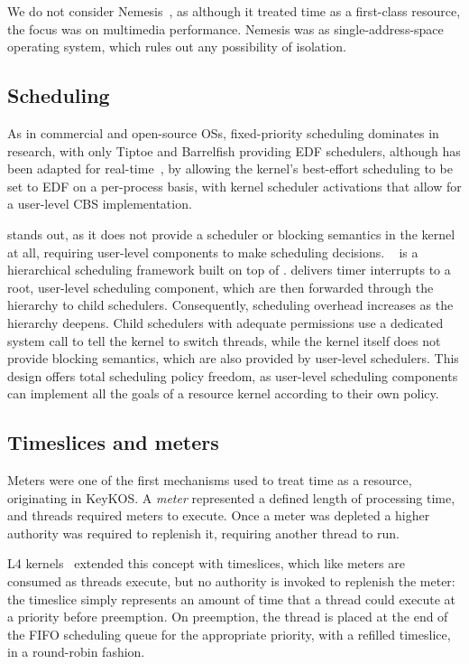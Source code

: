 We do not consider Nemesis~\citep{Leslie_MBRBEFH_96}, as although it treated time as a first-class
resource, the focus was on multimedia performance. Nemesis was as single-address-space operating
system, which rules out any possibility of isolation.

\subsection{Scheduling}

As in commercial and open-source \glspl{OS}, fixed-priority scheduling dominates in research, with
only Tiptoe and Barrelfish providing \gls{EDF} schedulers, although \minix has been adapted for 
real-time~\citep{Mancina_LFHGT_09}, by allowing the kernel's best-effort scheduling to be
set to \gls{EDF} on a per-process basis, with kernel scheduler activations that allow for a
user-level \gls{CBS} implementation.    

\composite stands out, as it does not provide a scheduler or blocking semantics in the kernel at all,
requiring user-level
components to make scheduling decisions. \hires~\citep{Parmer_West_11} is a hierarchical scheduling framework built on top
of \composite. 
 \hires delivers timer interrupts to a root, user-level scheduling component, which are then forwarded
through the hierarchy to child schedulers.  Consequently, scheduling overhead increases as the
hierarchy deepens.  Child schedulers with adequate permissions use a dedicated system call to tell
the kernel to switch threads, while the kernel itself does not provide blocking semantics, which are also
provided by user-level schedulers.  This design offers total scheduling policy freedom, as
user-level scheduling components can implement all the goals of a resource kernel according to
their own policy.

\subsection{Timeslices and meters}
\label{s:timeslices-and-meters}

Meters were one of the first mechanisms used to treat time as a resource, originating 
in KeyKOS. A \emph{meter} represented a
defined length of processing time, and threads required meters to execute. Once a meter was
depleted a higher authority was required to replenish it, requiring another thread to run.

L4 kernels~\citep{Elphinstone_Heiser_13} extended this concept with timeslices, 
which like meters are consumed as threads execute, but no
authority is invoked to replenish the meter: the timeslice simply represents an amount of time 
that a thread could execute at a priority before preemption. 
On preemption, the thread is placed at the end of
the \gls{FIFO} scheduling queue for the appropriate priority, with a refilled timeslice, in a
round-robin fashion. 

